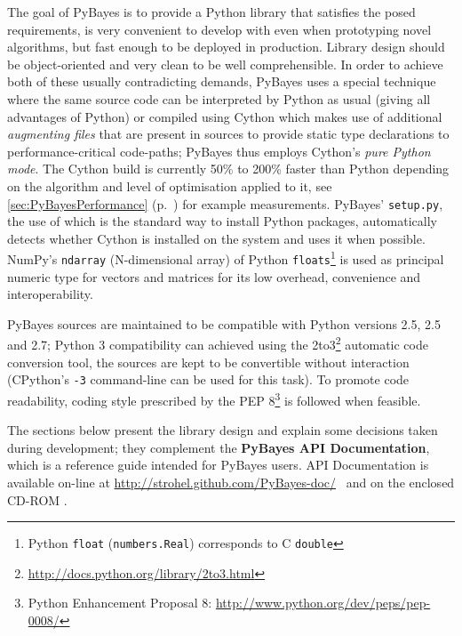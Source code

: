 The goal of PyBayes is to provide a Python library that satisfies the posed requirements, is very
convenient to develop with even when prototyping novel algorithms, but fast enough to be deployed in
production. Library design should be object-oriented and very clean to be well comprehensible.
In order to achieve both of these usually contradicting demands, PyBayes uses a special
technique where the same source code can be interpreted by Python as usual (giving all advantages
of Python) or compiled using Cython which makes use of additional \emph{augmenting files} that are present
in sources to provide static
type declarations to performance-critical code-paths; PyBayes thus employs Cython's \emph{pure Python
mode}. The Cython build is currently 50\% to 200\% faster than Python depending on the algorithm and
level of optimisation applied to it, see \autoref{sec:PyBayesPerformance} (p.~\pageref{sec:PyBayesPerformance})
for example measurements. PyBayes' \verb|setup.py|, the use of which is the standard way to install
Python packages, automatically detects whether Cython is installed on the system and uses it when
possible. NumPy's \verb|ndarray| (N-dimensional array) of Python \verb|floats|\footnote{Python
\verb|float| (\verb|numbers.Real|) corresponds to C \verb|double|} is used as principal
numeric type for vectors and matrices for its low overhead, convenience and interoperability.

PyBayes sources are maintained to be compatible with Python versions 2.5, 2.5 and 2.7; Python 3
compatibility can achieved using the 2to3\footnote{\url{http://docs.python.org/library/2to3.html}}
automatic code conversion tool, the sources are kept to be convertible without interaction
(CPython's \verb|-3| command-line can be used for this task). To promote code readability, coding
style prescribed by the PEP 8\footnote{Python Enhancement Proposal 8:
\url{http://www.python.org/dev/peps/pep-0008/}} is followed when feasible.

The sections below present the library design and explain some decisions taken during development;
they complement the \textbf{PyBayes API Documentation}, which is a reference guide intended for
PyBayes users. API Documentation is available on-line at \url{http://strohel.github.com/PyBayes-doc/}%
\ifattachements%
\ and on the enclosed CD-ROM%
\fi%
.

